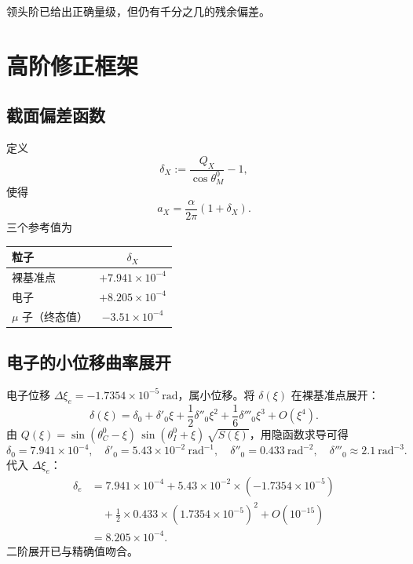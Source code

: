 \documentclass[12pt,a4paper]{article}
\theoremstyle{definition}
\begin{document}
领头阶已给出正确量级，但仍有千分之几的残余偏差。

\section{高阶修正框架}

\subsection{截面偏差函数}

定义
\begin{equation}
\boxed{\delta_X:=\frac{Q_X}{\cos\theta_M^0}-1,}
\end{equation}
使得
\begin{equation}
a_X=\frac{\alpha}{2\pi}(1+\delta_X).
\end{equation}
三个参考值为

\begin{center}
\begin{tabular}{@{}lc@{}}
\toprule
粒子 & $\delta_X$ \\
\midrule
裸基准点 & $+7.941\times10^{-4}$ \\
电子 & $+8.205\times10^{-4}$ \\
$\mu$ 子（终态值） & $-3.51\times10^{-4}$ \\
\bottomrule
\end{tabular}
\end{center}

\subsection{电子的小位移曲率展开}

电子位移 $\Delta\xi_e=-1.7354\times10^{-5}~\mathrm{rad}$，属小位移。将 $\delta(\xi)$ 在裸基准点展开：
\begin{equation}
\delta(\xi)=\delta_0+\delta'_0\xi+\frac{1}{2}\delta''_0\xi^2+\frac{1}{6}\delta'''_0\xi^3+O(\xi^4).
\end{equation}
由 $Q(\xi)=\sin(\theta_C^0-\xi)\,\sin(\theta_I^0+\xi)\,\sqrt{S(\xi)}$，用隐函数求导可得
\begin{equation}
\delta_0=7.941\times10^{-4},\quad \delta'_0=5.43\times10^{-2}~\mathrm{rad}^{-1},\quad \delta''_0=0.433~\mathrm{rad}^{-2},\quad \delta'''_0\approx2.1~\mathrm{rad}^{-3}.
\end{equation}
代入 $\Delta\xi_e$：
\begin{align}
\delta_e&=7.941\times10^{-4}+5.43\times10^{-2}\times(-1.7354\times10^{-5})\nonumber\\
&\quad+\frac{1}{2}\times0.433\times(1.7354\times10^{-5})^2+O(10^{-15})\\
&=8.205\times10^{-4}.\nonumber
\end{align}
二阶展开已与精确值吻合。
\end{document}
